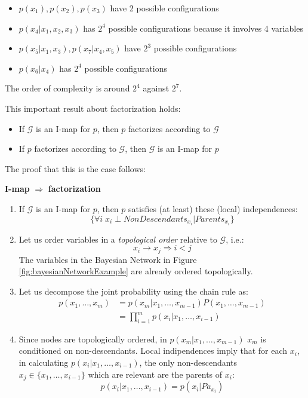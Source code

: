 \begin{itemize}
	\item $p(x_{1}),p(x_{2}),p(x_{3})$ have 2 possible configurations

	\item $p(x_{4}|x_{1},x_{2},x_{3})$ has $2^{4}$ possible configurations because
		it involves 4 variables

	\item $p(x_{5}|x_{1},x_{3}), p(x_{7}|x_{4},x_{5})$ have $2^{3}$ possible configurations

	\item $p(x_{6}|x_{4})$ has $2^{4}$ possible configurations
\end{itemize}
The order of complexity is around $2^{4}$ against $2^{7}$.
\newline

This important result about factorization holds:
\begin{itemize}
	\item If $\mathcal{G}$ is an I-map for $p$, then $p$ factorizes according to
		$\mathcal{G}$

	\item If $p$ factorizes according to $\mathcal{G}$, then $\mathcal{G}$ is an I-map
		for $p$
\end{itemize}

The proof that this is the case follows:
\newline

\textbf{I-map} $\Rightarrow$ \textbf{factorization}
\begin{enumerate}
	\item If $\mathcal{G}$ is an I-map for $p$, then $p$ satisfies (at least)
		these (local) independences:
		\[
			\{ \forall i \; x_{i}\perp \mathit{NonDescendants}_{x_i}| \mathit{Parents}_{x_i}
			\}
		\]

	\item Let us order variables in a \textit{topological order} relative to
		$\mathcal{G}$, i.e.:
		\[
			x_{i}\rightarrow x_{j}\Rightarrow i<j
		\]
		The variables in the Bayesian Network in Figure \ref{fig:bayesianNetworkExample}
		are already ordered topologically.

	\item Let us decompose the joint probability using the chain rule as:
		\begin{align*}
			p(x_{1}, \hdots, x_{m}) & = p(x_{m}| x_{1}, \hdots, x_{m-1})P(x_{1},\hdots,x_{m-1}) \\
			                        & = \prod_{i=1}^{m}p(x_{i}| x_{1}, \hdots, x_{i-1})
		\end{align*}

	\item Since nodes are topologically ordered, in
		$p(x_{m}| x_{1}, \hdots, x_{m-1})$ $x_{m}$ is conditioned on non-descendants.
		Local indipendences imply that for each $x_{i}$, in calculating
		$p(x_{i}| x_{1}, \hdots, x_{i-1})$, the only non-descendants $x_{j}\in \{x_{1}
		, \hdots, x_{i-1}\}$ which are relevant are the parents of $x_{i}$:
		\[
			p(x_{i}| x_{1}, \hdots, x_{i-1}) = p(x_{i}| \mathit{Pa}_{x_i})
		\]
\end{enumerate}


